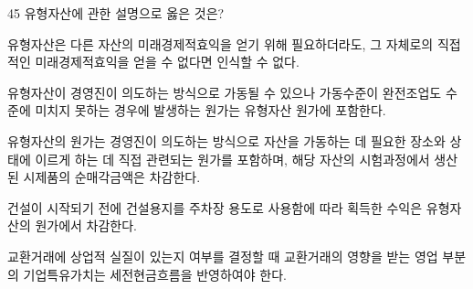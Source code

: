 \begin{question}{45}
유형자산에 관한 설명으로 옳은 것은?
\begin{choices}
  \item 유형자산은 다른 자산의 미래경제적효익을 얻기 위해 필요하더라도, 그 자체로의 직접적인 미래경제적효익을 얻을 수 없다면 인식할 수 없다.
  \item 유형자산이 경영진이 의도하는 방식으로 가동될 수 있으나 가동수준이 완전조업도 수준에 미치지 못하는 경우에 발생하는 원가는 유형자산 원가에 포함한다.
  \item 유형자산의 원가는 경영진이 의도하는 방식으로 자산을 가동하는 데 필요한 장소와 상태에 이르게 하는 데 직접 관련되는 원가를 포함하며, 해당 자산의 시험과정에서 생산된 시제품의 순매각금액은 차감한다.
  \item 건설이 시작되기 전에 건설용지를 주차장 용도로 사용함에 따라 획득한 수익은 유형자산의 원가에서 차감한다.
  \item 교환거래에 상업적 실질이 있는지 여부를 결정할 때 교환거래의 영향을 받는 영업 부분의 기업특유가치는 세전현금흐름을 반영하여야 한다.
\end{choices}
\end{question}
